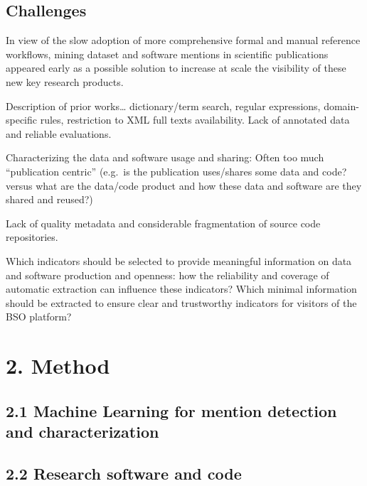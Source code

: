 \documentclass[
]{article}
\begin{document}
\hypertarget{challenges}{%
\subsection{Challenges}\label{challenges}}

In view of the slow adoption of more comprehensive formal and manual
reference workflows, mining dataset and software mentions in scientific
publications appeared early as a possible solution to increase at scale
the visibility of these new key research products.

Description of prior works\ldots{} dictionary/term search, regular
expressions, domain-specific rules, restriction to XML full texts
availability. Lack of annotated data and reliable evaluations.

Characterizing the data and software usage and sharing: Often too much
``publication centric'' (e.g.~is the publication uses/shares some data
and code? versus what are the data/code product and how these data and
software are they shared and reused?)

Lack of quality metadata and considerable fragmentation of source code
repositories.

Which indicators should be selected to provide meaningful information on
data and software production and openness: how the reliability and
coverage of automatic extraction can influence these indicators? Which
minimal information should be extracted to ensure clear and trustworthy
indicators for visitors of the BSO platform?

\hypertarget{method}{%
\section{2. Method}\label{method}}

\hypertarget{machine-learning-for-mention-detection-and-characterization}{%
\subsection{2.1 Machine Learning for mention detection and
characterization}\label{machine-learning-for-mention-detection-and-characterization}}

\hypertarget{research-software-and-code}{%
\subsection{2.2 Research software and
code}\label{research-software-and-code}}
\end{document}
